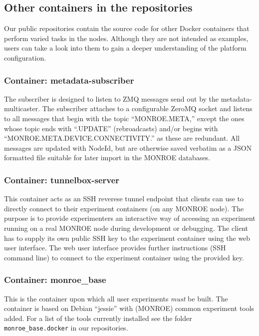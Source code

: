 \documentclass[a4paper,10pt]{article}
\newcommand{\monroe}{MONROE}
\newcommand{\identifier}[1]{{\texttt{\small{#1}}}}
\begin{document}
\subsection{Other containers in the repositories}

Our public repositories contain the source code for other Docker containers that perform varied tasks in the nodes.
Although they are not intended as examples, users can take a look into them to gain a deeper understanding of the platform configuration. 

\subsubsection{Container: metadata-subscriber}

The subscriber is designed to listen to ZMQ messages send out by the metadata-multicaster.
The subscriber attaches to a configurable ZeroMQ socket and listens to all messages that begin with the topic ``MONROE.META,'' except the ones whose topic ends with ``.UPDATE'' (rebroadcasts) and/or begins with ``MONROE.META.DEVICE.CONNECTIVITY.'' as these are redundant.
All messages are updated with NodeId, but are otherwise saved verbatim as a JSON formatted file suitable for later import in the \monroe{} databases.

\subsubsection{Container: tunnelbox-server}

This container acts as an SSH reverese tunnel endpoint that clients can use to directly connect to their experiment containers (on any \monroe{} node).
The purpose is to provide experimenters an interactive way of accessing an experiment running on a real \monroe{} node during development or debugging. 
The client has to supply its own public SSH key to the experiment container using the web user interface.
The web user interface provides further instructions (SSH command line) to connect to the experiment container using the provided key.

\subsubsection{Container: monroe\_base}

This is the container upon which all user experiments \emph{must} be built.
The container is based on Debian ``jessie'' with (\monroe{}) common experiment tools added.
For a list of the tools currently installed see the folder \identifier{monroe\_base.docker} in our repositories.
\end{document}
